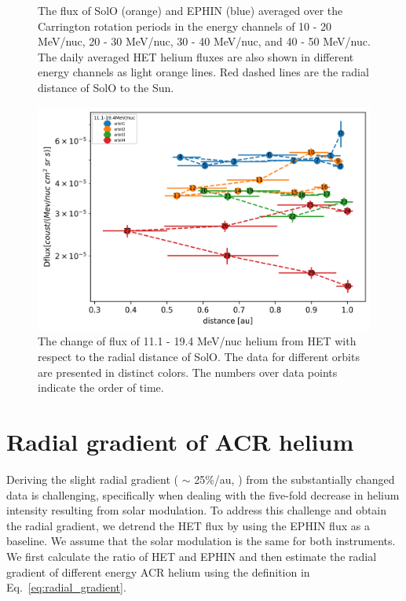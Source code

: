 \begin{figure}
    \caption[The averaged helium flux in four energy channels between 10 and 50 MeV/nuc]{The flux of \ac{SolO} (orange) and \ac{EPHIN} (blue) averaged over the Carrington rotation periods in the energy channels of 10 - 20 MeV/nuc, 20 - 30 MeV/nuc, 30 - 40 MeV/nuc, and 40 - 50 MeV/nuc. The daily averaged \ac{HET} helium fluxes are also shown in different energy channels as light orange lines. Red dashed lines are the radial distance of \ac{SolO} to the Sun.}
    \label{fig:carrington_flux}
\end{figure}

\begin{figure}
    \centering
    \includegraphics[scale = 0.8]{images/ACR/SOLO-flux_only.png}
    \caption[11.1 - 19.4 MeV/nuc \ac{HET} helium flux vs the radial distance of \ac{SolO}]{The change of flux of 11.1 - 19.4 MeV/nuc helium from \ac{HET} with respect to the radial distance of \ac{SolO}. The data for different orbits are presented in distinct colors. The numbers over data points indicate the order of time. }
    \label{fig:fluxvsdistance}  
\end{figure}


\section{Radial gradient of ACR helium}

Deriving the slight radial gradient ( $\sim$ 25\%/au, \citet{Rankin2021ApJ}) from the substantially changed data is challenging, specifically when dealing with the five-fold decrease in helium intensity resulting from solar modulation.
To address this challenge and obtain the radial gradient, we detrend the \ac{HET} flux by using the \ac{EPHIN} flux as a baseline. We assume that the solar modulation is the same for both instruments. We first calculate the ratio of \ac{HET} and \ac{EPHIN} and then estimate the radial gradient of different energy \ac{ACR} helium using the definition in Eq.~\ref{eq:radial_gradient}.


